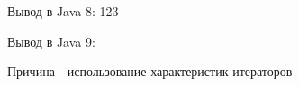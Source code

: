\begin{frame}
\frametitle{\insertsection} 
\framesubtitle{\insertsubsection}
\inputminted{java}{code/Spliterator-props.java}
Вывод в Java 8: 123

Вывод в Java 9:

Причина - использование характеристик итераторов
\end{frame}
